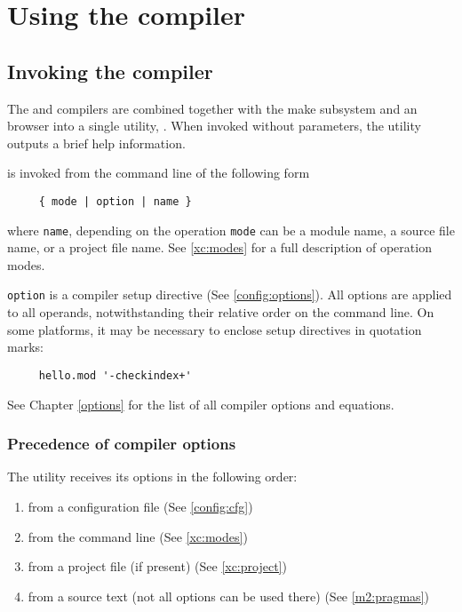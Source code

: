 
\chapter{Using the compiler}\label{usage}

\section{Invoking the compiler}

The \xds{} \mt{} and \ot{} compilers are combined together with
the make subsystem and an \ot{} browser into a single
utility, \xc{}. When invoked without parameters, the utility outputs
a brief help information.

\xc{} is invoked from the command line of the following form

\verb'    '\xc{}\verb' { mode | option | name }'

where \verb'name', depending on the operation \verb'mode' can be
a module name, a source file name, or a project file name.
See \ref{xc:modes} for a full description of operation modes.

\verb'option' is a compiler setup directive (See \ref{config:options}).
All options are applied to all operands, notwithstanding their relative order
on the command line. On some platforms, it may be
necessary to enclose setup directives in quotation marks:

\verb'    '\xc{}\verb" hello.mod '-checkindex+'"

See Chapter \ref{options} for the list of all compiler options
and equations.

\subsection{Precedence of compiler options}\label{precedence}

The \xc{} utility receives its options in the following order:
\begin{enumerate}
\item         from a configuration file {\bf \cfg} (See \ref{config:cfg})
\item         from the command line (See \ref{xc:modes})
\item         from a project file (if present) (See \ref{xc:project})
\item         from a source text (not all options can be used there)
              (See \ref{m2:pragmas})
\end{enumerate}

